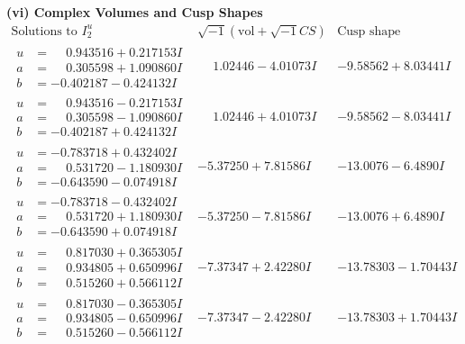 \documentclass[1p]{elsarticle_modified}
\theoremstyle{definition}
\newcommand{\I}{\sqrt{-1}}
\begin{document}
\newpage\flushleft \textbf{(vi) Complex Volumes and Cusp Shapes}
$$\begin{array}{c|c|c}  
\text{Solutions to }I^u_{2}& \I (\text{vol} + \sqrt{-1}CS) & \text{Cusp shape}\\
 \hline 
\begin{aligned}
u &= \phantom{-}0.943516 + 0.217153 I \\
a &= \phantom{-}0.305598 + 1.090860 I \\
b &= -0.402187 - 0.424132 I\end{aligned}
 & \phantom{-}1.02446 - 4.01073 I & -9.58562 + 8.03441 I \\ \hline\begin{aligned}
u &= \phantom{-}0.943516 - 0.217153 I \\
a &= \phantom{-}0.305598 - 1.090860 I \\
b &= -0.402187 + 0.424132 I\end{aligned}
 & \phantom{-}1.02446 + 4.01073 I & -9.58562 - 8.03441 I \\ \hline\begin{aligned}
u &= -0.783718 + 0.432402 I \\
a &= \phantom{-}0.531720 - 1.180930 I \\
b &= -0.643590 - 0.074918 I\end{aligned}
 & -5.37250 + 7.81586 I & -13.0076 - 6.4890 I \\ \hline\begin{aligned}
u &= -0.783718 - 0.432402 I \\
a &= \phantom{-}0.531720 + 1.180930 I \\
b &= -0.643590 + 0.074918 I\end{aligned}
 & -5.37250 - 7.81586 I & -13.0076 + 6.4890 I \\ \hline\begin{aligned}
u &= \phantom{-}0.817030 + 0.365305 I \\
a &= \phantom{-}0.934805 + 0.650996 I \\
b &= \phantom{-}0.515260 + 0.566112 I\end{aligned}
 & -7.37347 + 2.42280 I & -13.78303 - 1.70443 I \\ \hline\begin{aligned}
u &= \phantom{-}0.817030 - 0.365305 I \\
a &= \phantom{-}0.934805 - 0.650996 I \\
b &= \phantom{-}0.515260 - 0.566112 I\end{aligned}
 & -7.37347 - 2.42280 I & -13.78303 + 1.70443 I \\ \hline\begin{aligned}

\end{aligned}
\end{array}$$
\end{document}
